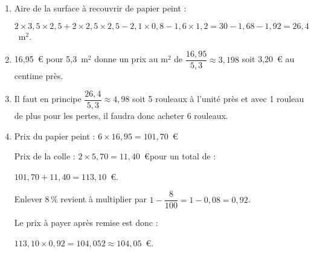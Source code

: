 

	\begin{enumerate}
		\item %
Aire de la surface  à recouvrir de papier peint :

$2 \times 3,5 \times 2,5 + 2 \times 2,5 \times 2,5 - 2,1 \times 0,8 - 1,6 \times 1,2 = 30 - 1,68 - 1,92 = 26,4$~m$^2$.		
		\item %
16,95~\euro{} pour 5,3~m$^2$ donne un prix au m$^2$ de $\dfrac{16,95}{5,3} \approx 3,198$ soit 3,20~\euro{} au centime près.		
		\item %
Il faut en principe $\dfrac{26,4}{5,3} \approx 4,98$ soit 5 rouleaux à l'unité près et avec 1 rouleau de plus pour les pertes, il faudra donc acheter 6 rouleaux.		
		\item %
		
Prix du papier peint : $6 \times 16,95 = 101,70$~\euro

Prix de la colle : $2 \times 5,70 = 11,40$~\euro pour un total de :

$101,70 + 11,40 = 113,10$~\euro.

Enlever 8\,\% revient à multiplier par $1 - \dfrac{8}{100} = 1 - 0,08 = 0,92$.

Le prix à payer après remise est donc :

$113,10 \times 0,92 = 104,052 \approx 104,05$~\euro.
	\end{enumerate}

